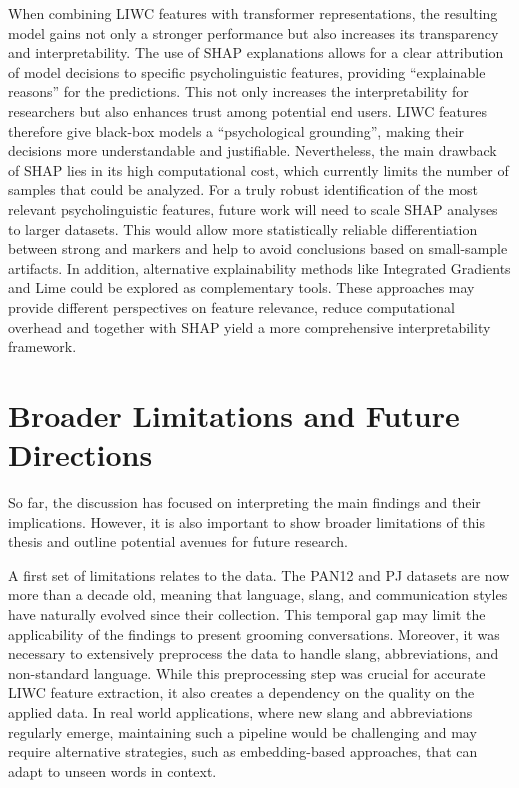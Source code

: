 When combining LIWC features with transformer representations, the resulting model gains not only a stronger performance but also increases its transparency and interpretability. The use of SHAP explanations allows for a clear attribution of model decisions to specific psycholinguistic features, providing “explainable reasons” for the predictions. This not only increases the interpretability for researchers but also enhances trust among potential end users. LIWC features therefore give black-box models a “psychological grounding”, making their decisions more understandable and justifiable. Nevertheless, the main drawback of SHAP lies in its high computational cost, which currently limits the number of samples that could be analyzed. For a truly robust identification of the most relevant psycholinguistic features, future work will need to scale SHAP analyses to larger datasets. This would allow more statistically reliable differentiation between strong and markers and help to avoid conclusions based on small-sample artifacts. In addition, alternative explainability methods like Integrated Gradients\cite{integratedgradients} and Lime \cite{ribeiro2016lime} could be explored as complementary tools. These approaches may provide different perspectives on feature relevance, reduce computational overhead and together with SHAP yield a more comprehensive interpretability framework.


\section{Broader Limitations and Future Directions}

So far, the discussion has focused on interpreting the main findings and their implications. However, it is also important to show broader limitations of this thesis and outline potential avenues for future research.  

A first set of limitations relates to the data. The PAN12 and PJ datasets are now more than a decade old, meaning that language, slang, and communication styles have naturally evolved since their collection. This temporal gap may limit the applicability of the findings to present grooming conversations. Moreover, it was necessary to extensively preprocess the data to handle slang, abbreviations, and non-standard language. While this preprocessing step was crucial for accurate LIWC feature extraction, it also creates a dependency on the quality on the applied data. In real world applications, where new slang and abbreviations regularly emerge, maintaining such a pipeline would be challenging and may require alternative strategies, such as embedding-based approaches, that can adapt to unseen words in context.  

